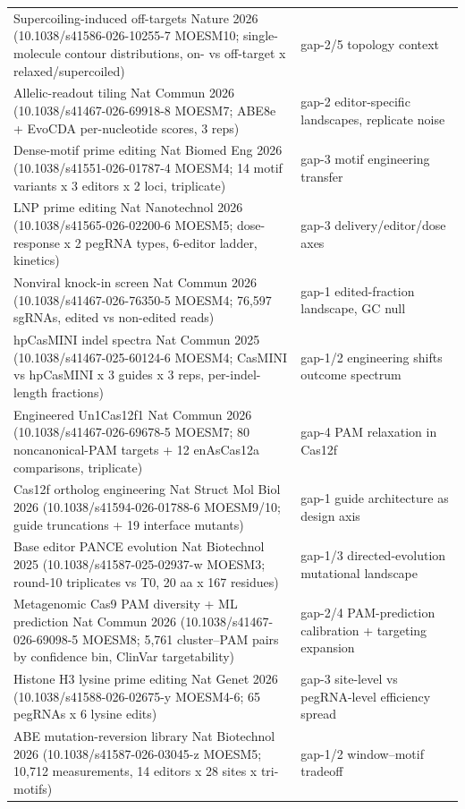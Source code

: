 \begin{longtable}{@{}p{}p{}@{}}
Supercoiling-induced off-targets Nature 2026 (10.1038/s41586-026-10255-7 MOESM10; single-molecule contour distributions, on- vs off-target x relaxed/supercoiled) & gap-2/5 topology context \\
Allelic-readout tiling Nat Commun 2026 (10.1038/s41467-026-69918-8 MOESM7; ABE8e + EvoCDA per-nucleotide scores, 3 reps) & gap-2 editor-specific landscapes, replicate noise \\
Dense-motif prime editing Nat Biomed Eng 2026 (10.1038/s41551-026-01787-4 MOESM4; 14 motif variants x 3 editors x 2 loci, triplicate) & gap-3 motif engineering transfer \\
LNP prime editing Nat Nanotechnol 2026 (10.1038/s41565-026-02200-6 MOESM5; dose-response x 2 pegRNA types, 6-editor ladder, kinetics) & gap-3 delivery/editor/dose axes \\
Nonviral knock-in screen Nat Commun 2026 (10.1038/s41467-026-76350-5 MOESM4; 76,597 sgRNAs, edited vs non-edited reads) & gap-1 edited-fraction landscape, GC null \\
hpCasMINI indel spectra Nat Commun 2025 (10.1038/s41467-025-60124-6 MOESM4; CasMINI vs hpCasMINI x 3 guides x 3 reps, per-indel-length fractions) & gap-1/2 engineering shifts outcome spectrum \\
Engineered Un1Cas12f1 Nat Commun 2026 (10.1038/s41467-026-69678-5 MOESM7; 80 noncanonical-PAM targets + 12 enAsCas12a comparisons, triplicate) & gap-4 PAM relaxation in Cas12f \\
Cas12f ortholog engineering Nat Struct Mol Biol 2026 (10.1038/s41594-026-01788-6 MOESM9/10; guide truncations + 19 interface mutants) & gap-1 guide architecture as design axis \\
Base editor PANCE evolution Nat Biotechnol 2025 (10.1038/s41587-025-02937-w MOESM3; round-10 triplicates vs T0, 20 aa x 167 residues) & gap-1/3 directed-evolution mutational landscape \\
Metagenomic Cas9 PAM diversity + ML prediction Nat Commun 2026 (10.1038/s41467-026-69098-5 MOESM8; 5,761 cluster--PAM pairs by confidence bin, ClinVar targetability) & gap-2/4 PAM-prediction calibration + targeting expansion \\
Histone H3 lysine prime editing Nat Genet 2026 (10.1038/s41588-026-02675-y MOESM4-6; 65 pegRNAs x 6 lysine edits) & gap-3 site-level vs pegRNA-level efficiency spread \\
ABE mutation-reversion library Nat Biotechnol 2026 (10.1038/s41587-026-03045-z MOESM5; 10,712 measurements, 14 editors x 28 sites x tri-motifs) & gap-1/2 window--motif tradeoff \\

\end{longtable}
